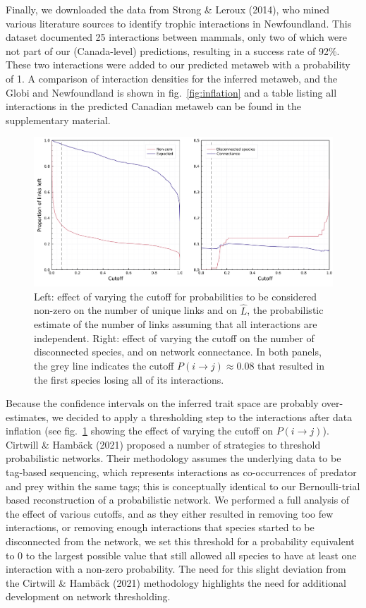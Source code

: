 \documentclass[11pt]{article}
\makeatletter
\def\maxwidth{\ifdim\Gin@nat@width>\linewidth\linewidth
\else\Gin@nat@width\fi}
\let\Oldincludegraphics\includegraphics
\renewcommand{\includegraphics}[1]{\Oldincludegraphics[width=\maxwidth]{#1}}
\makeatother
\begin{document}
Finally, we downloaded the data from Strong \& Leroux (2014), who mined
various literature sources to identify trophic interactions in
Newfoundland. This dataset documented 25 interactions between mammals,
only two of which were not part of our (Canada-level) predictions,
resulting in a success rate of 92\%. These two interactions were added
to our predicted metaweb with a probability of 1. A comparison of
interaction densities for the inferred metaweb, and the Globi and
Newfoundland is shown in fig.~\ref{fig:inflation} and a table listing
all interactions in the predicted Canadian metaweb can be found in the
supplementary material.

\begin{figure}
\hypertarget{fig:thresholds}{%
\centering
\includegraphics{figures/figure-cutoffs.png}
\caption{Left: effect of varying the cutoff for probabilities to be
considered non-zero on the number of unique links and on \(\hat{L}\),
the probabilistic estimate of the number of links assuming that all
interactions are independent. Right: effect of varying the cutoff on the
number of disconnected species, and on network connectance. In both
panels, the grey line indicates the cutoff
\(P(i\rightarrow j) \approx 0.08\) that resulted in the first species
losing all of its interactions.}\label{fig:thresholds}
}
\end{figure}

Because the confidence intervals on the inferred trait space are
probably over-estimates, we decided to apply a thresholding step to the
interactions after data inflation (see fig.~\ref{fig:thresholds} showing
the effect of varying the cutoff on \(P(i \rightarrow j)\)). Cirtwill \&
Hambäck (2021) proposed a number of strategies to threshold
probabilistic networks. Their methodology assumes the underlying data to
be tag-based sequencing, which represents interactions as co-occurrences
of predator and prey within the same tags; this is conceptually
identical to our Bernoulli-trial based reconstruction of a probabilistic
network. We performed a full analysis of the effect of various cutoffs,
and as they either resulted in removing too few interactions, or
removing enough interactions that species started to be disconnected
from the network, we set this threshold for a probability equivalent to
0 to the largest possible value that still allowed all species to have
at least one interaction with a non-zero probability. The need for this
slight deviation from the Cirtwill \& Hambäck (2021) methodology
highlights the need for additional development on network thresholding.
\end{document}

